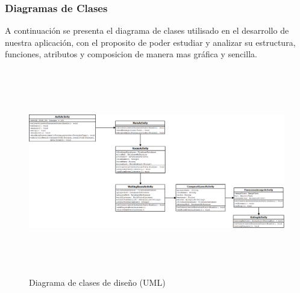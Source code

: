 \documentclass[12pt]{article}
\begin{document}
\subsubsection{Diagramas de Clases}
A continuación se presenta el diagrama de clases utilisado en el desarrollo de nuestra aplicación, con el proposito de poder estudiar y analizar su estructura, funciones, atributos y composicion de manera mas gráfica y sencilla.

\begin{figure}[H]
	\includegraphics[width=16cm, height=9cm]{imgs/uml_isw.png}
	\caption{Diagrama de clases de diseño (UML)}
\end{figure}
\newpage
\end{document}
